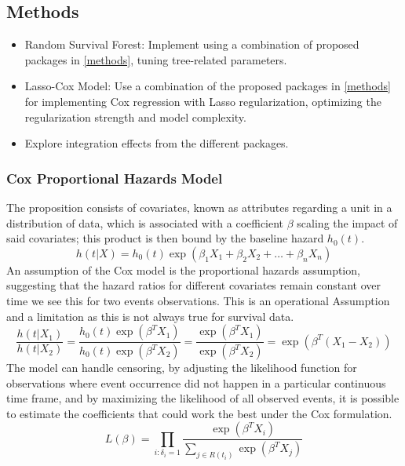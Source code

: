 \subsection{Methods}
\begin{itemize}
\item Random Survival Forest: Implement using a combination of proposed packages in \ref{methods}, tuning tree-related parameters.
\item Lasso-Cox Model: Use a combination of the proposed packages in \ref{methods} for implementing Cox regression with Lasso regularization, optimizing the regularization strength and model complexity. 
\item Explore integration effects from the different packages.
\end{itemize}

\subsubsection*{Cox Proportional Hazards Model}
The proposition consists of covariates, known as attributes regarding a unit in a distribution of data, which is associated with a coefficient \(\beta\) scaling the impact of said covariates; this product is then bound by the baseline hazard \(h_{0}(t)\).
\begin{equation} \label{eq:cox}h(t|X) = h_0(t) \exp(\beta_1 X_1 + \beta_2 X_2 + \ldots + \beta_n X_n)\end{equation}
An assumption of the Cox model is the proportional hazards assumption, suggesting that the hazard ratios for different covariates remain constant over time we see this for two events observations. This is an operational Assumption and a limitation as this is not always true for survival data. 
\begin{equation} \label{eq:coxph}\frac{h(t|X_1)}{h(t|X_2)} = \frac{h_0(t) \exp(\beta^T X_1)}{h_0(t) \exp(\beta^T X_2)} = \frac{\exp(\beta^T X_1)}{\exp(\beta^T X_2)} = \exp(\beta^T (X_1 - X_2))\end{equation}
The model can handle censoring, by adjusting the likelihood function for observations where event occurrence did not happen in a particular continuous time frame, and by maximizing the likelihood of all observed events, it is possible to estimate the coefficients that could work the best under the Cox formulation.
\begin{equation} \label{eq:coxlikely}L(\beta) = \prod_{i: \delta_i = 1} \frac{\exp(\beta^T X_i)}{\sum_{j \in R(t_i)} \exp(\beta^T X_j)}\end{equation}

